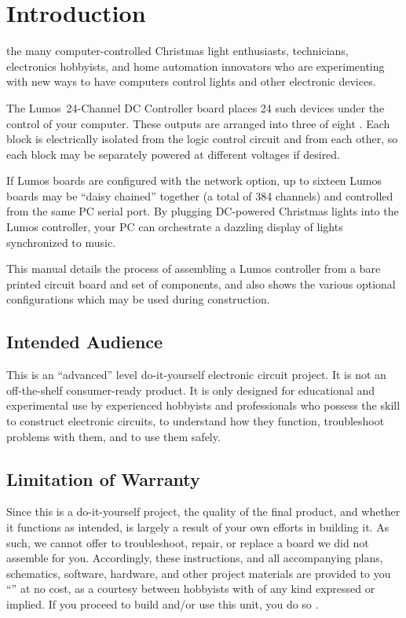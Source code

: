 \documentclass[letterpaper,twoside,onecolumn,openright,final]{memoir}
\begin{document}
\newpage
\tableofcontents

\mainmatter

\chapter{Introduction}
 the many computer-controlled
Christmas light enthusiasts,  technicians, electronics hobbyists,
and home automation innovators who are experimenting with new ways to have computers
control lights and other electronic devices.

The Lumos\TM\ 24-Channel DC Controller board places 24 such devices under the control
of your computer.  These outputs are arranged into three  of eight .
Each block is electrically isolated from the logic control circuit and from each other,
so each block may be separately powered at different voltages if desired.

If Lumos boards are configured with the  network option, up to sixteen Lumos
boards may be ``daisy chained'' together (a total of 384 channels) and controlled from 
the same PC serial port.
By plugging DC-powered Christmas lights into the Lumos controller, your PC can orchestrate
a dazzling display of lights synchronized to music.

This manual details the process of assembling a Lumos controller from a bare printed
circuit board and set of components, and also shows the various optional configurations
which may be used during construction.

\section{Intended Audience}
This is an ``advanced'' level do-it-yourself electronic circuit project.  It is not
an off-the-shelf consumer-ready product.  It is only designed for educational and experimental
use by experienced hobbyists and professionals who possess the skill to construct electronic
circuits, to understand how they function, troubleshoot problems with them, and to use them safely.

\section{Limitation of Warranty}
Since this is a do-it-yourself project, the quality of the final product, and whether it 
functions as intended, is largely a result of your own efforts in building it.  As such, we
cannot offer to troubleshoot, repair, or replace a board we did not assemble for you.  Accordingly,
these instructions, and all accompanying plans, schematics, software, hardware, and other
project materials are provided to you ``'' at no cost, as a courtesy between 
 hobbyists with  of any kind expressed or implied.  If you proceed
to build and/or use this unit, you do so .
\end{document}
